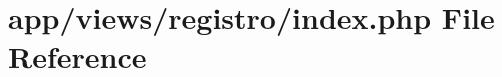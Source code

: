 \hypertarget{app_2views_2registro_2index_8php}{}\section{app/views/registro/index.php File Reference}
\label{app_2views_2registro_2index_8php}
